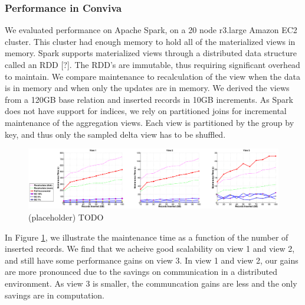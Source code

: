\subsubsection{Performance in Conviva}
We evaluated performance on Apache Spark, on a 20 node r3.large Amazon EC2 cluster. 
This cluster had enough memory to hold all of the materialized views in memory.
Spark supports materialized views through a distributed data structure called an RDD [?].
The RDD's are immutable, thus requiring significant overhead to maintain.
We compare maintenance to recalculation of the view when the data is in memory and when only the updates are in memory. 
We derived the views from a 120GB base relation and inserted records in 10GB increments.
As Spark does not have support for indices, we rely on partitioned joins for incremental maintenance of the aggregation views.
Each view is partitioned by the group by key, and thus only the sampled delta view has to be shuffled. 

\begin{figure}[ht!]
\label{exp6conviva}
\centering
\includegraphics[width=\textwidth]{exp/exp5-efficiency-conviva.eps}
 \caption{(placeholder) TODO}
\end{figure}

In Figure \ref{exp6conviva}, we illustrate the maintenance time as a function of the number of inserted records.
We find that we acheive good scalability on view 1 and view 2, and still have some performance gains on view 3.
In view 1 and view 2, our gains are more pronounced due to the savings on communication in a distributed environment.
As view 3 is smaller, the communcation gains are less and the only savings are in computation.

